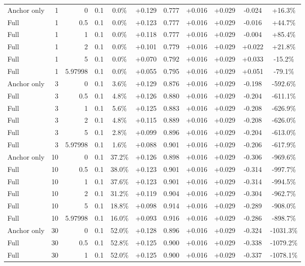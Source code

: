 \begin{table}[htbp]
\begin{tabular}{lrrrccccccc}
Anchor only & 1 & 0 & 0.1 & 0.0\% & +0.129 & 0.777 & +0.016 & +0.029 & -0.024 & +16.3\% \\
Full & 1 & 0.5 & 0.1 & 0.0\% & +0.123 & 0.777 & +0.016 & +0.029 & -0.016 & +44.7\% \\
Full & 1 & 1 & 0.1 & 0.0\% & +0.118 & 0.777 & +0.016 & +0.029 & -0.004 & +85.4\% \\
Full & 1 & 2 & 0.1 & 0.0\% & +0.101 & 0.779 & +0.016 & +0.029 & +0.022 & +21.8\% \\
Full & 1 & 5 & 0.1 & 0.0\% & +0.070 & 0.792 & +0.016 & +0.029 & +0.033 & -15.2\% \\
Full & 1 & 5.97998 & 0.1 & 0.0\% & +0.055 & 0.795 & +0.016 & +0.029 & +0.051 & -79.1\% \\
Anchor only & 3 & 0 & 0.1 & 3.6\% & +0.129 & 0.876 & +0.016 & +0.029 & -0.198 & -592.6\% \\
Full & 3 & 0.5 & 0.1 & 4.8\% & +0.126 & 0.880 & +0.016 & +0.029 & -0.204 & -611.1\% \\
Full & 3 & 1 & 0.1 & 5.6\% & +0.125 & 0.883 & +0.016 & +0.029 & -0.208 & -626.9\% \\
Full & 3 & 2 & 0.1 & 4.8\% & +0.115 & 0.889 & +0.016 & +0.029 & -0.208 & -626.0\% \\
Full & 3 & 5 & 0.1 & 2.8\% & +0.099 & 0.896 & +0.016 & +0.029 & -0.204 & -613.0\% \\
Full & 3 & 5.97998 & 0.1 & 1.6\% & +0.088 & 0.901 & +0.016 & +0.029 & -0.206 & -617.9\% \\
Anchor only & 10 & 0 & 0.1 & 37.2\% & +0.126 & 0.898 & +0.016 & +0.029 & -0.306 & -969.6\% \\
Full & 10 & 0.5 & 0.1 & 38.0\% & +0.123 & 0.901 & +0.016 & +0.029 & -0.314 & -997.7\% \\
Full & 10 & 1 & 0.1 & 37.6\% & +0.123 & 0.901 & +0.016 & +0.029 & -0.314 & -994.5\% \\
Full & 10 & 2 & 0.1 & 31.2\% & +0.119 & 0.904 & +0.016 & +0.029 & -0.304 & -962.7\% \\
Full & 10 & 5 & 0.1 & 18.8\% & +0.098 & 0.914 & +0.016 & +0.029 & -0.289 & -908.0\% \\
Full & 10 & 5.97998 & 0.1 & 16.0\% & +0.093 & 0.916 & +0.016 & +0.029 & -0.286 & -898.7\% \\
Anchor only & 30 & 0 & 0.1 & 52.0\% & +0.128 & 0.896 & +0.016 & +0.029 & -0.324 & -1031.3\% \\
Full & 30 & 0.5 & 0.1 & 52.8\% & +0.125 & 0.900 & +0.016 & +0.029 & -0.338 & -1079.2\% \\
Full & 30 & 1 & 0.1 & 52.0\% & +0.125 & 0.900 & +0.016 & +0.029 & -0.337 & -1078.1\% \\

\end{tabular}
\end{table}
